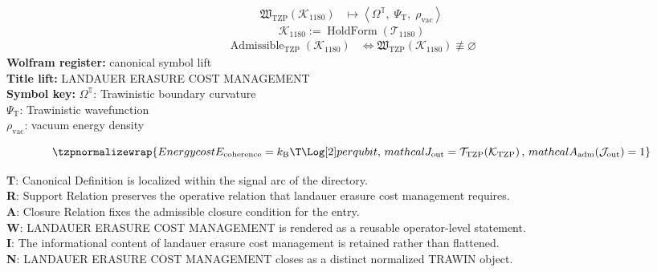 \noindent
\begin{minipage}[t]{0.48\linewidth}
\begingroup
\small
\[
\begin{aligned}
\mathfrak{W}_{\mathrm{TZP}}\!\left(\mathcal{K}_{1180}\right)
&\longmapsto
\left\langle \Omega^{\mathbb{T}},\; \Psi_{\mathrm{T}},\; \rho_{\mathrm{vac}} \right\rangle
\end{aligned}
\]
\[
\mathcal{K}_{1180}
:=
\operatorname{HoldForm}\!\left(\mathcal{T}_{1180}\right)
\]
\[
\begin{aligned}
\operatorname{Admissible}_{\mathrm{TZP}}\!\left(\mathcal{K}_{1180}\right)
&\Longleftrightarrow
\mathfrak{W}_{\mathrm{TZP}}\!\left(\mathcal{K}_{1180}\right)\not\equiv\varnothing
\end{aligned}
\]
\textbf{Wolfram register:} canonical symbol lift\\
\textbf{Title lift:} LANDAUER ERASURE COST MANAGEMENT\\
\textbf{Symbol key:} \(\Omega^{\mathbb{T}}\): Trawinistic boundary curvature\\ \(\Psi_{\mathrm{T}}\): Trawinistic wavefunction\\ \(\rho_{\mathrm{vac}}\): vacuum energy density
\par
\endgroup
\end{minipage}\hfill
\begin{minipage}[t]{0.48\linewidth}
\[
\tzpnormalizewrap{Energy cost E_{\mathrm{coherence}} = k_{\mathrm{B}} \T \Log[2] per qubit,\,mathcal{J}_{\mathrm{out}} = \mathcal{T}_{\mathrm{TZP}}\!\left(\mathcal{K}_{\mathrm{TZP}}\right),\,mathcal{A}_{\mathrm{adm}}\!\left(\mathcal{J}_{\mathrm{out}}\right)=1}
\]

\small
\textbf{T}: Canonical Definition is localized within the signal arc of the directory.\\
\textbf{R}: Support Relation preserves the operative relation that landauer erasure cost management requires.\\
\textbf{A}: Closure Relation fixes the admissible closure condition for the entry.\\
\textbf{W}: LANDAUER ERASURE COST MANAGEMENT is rendered as a reusable operator-level statement.\\
\textbf{I}: The informational content of landauer erasure cost management is retained rather than flattened.\\
\textbf{N}: LANDAUER ERASURE COST MANAGEMENT closes as a distinct normalized TRAWIN object.
\normalsize
\end{minipage}

